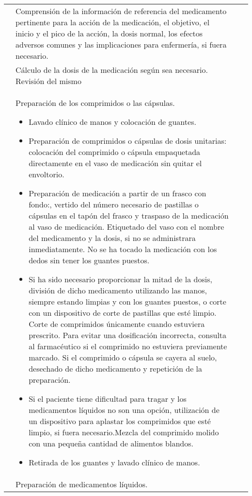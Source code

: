 \begin{landscape}
\begin{longtable}{N{0.15\textwidth}M{0.94\textwidth}|M{0.095\textwidth}M{0.22\textwidth}}
            & Comprensión de la información de referencia del medicamento pertinente para la acción de la medicación, el objetivo, el inicio y el pico de la acción, la dosis normal, los efectos adversos comunes y las implicaciones para enfermería, si fuera necesario.
            & & \\  
            & Cálculo de la dosis de la medicación según sea necesario. Revisión del mismo
            & & \\ 
            & Preparación de los comprimidos o las cápsulas.
            \begin{itemize}[topsep=0pt, partopsep=0pt,itemsep=0pt,parsep=0pt]
                \item Lavado clínico de manos y colocación de guantes.
                \item Preparación de comprimidos o cápsulas de dosis unitarias: colocación del comprimido o cápsula empaquetada directamente en el vaso de medicación sin quitar el envoltorio.
                \item Preparación de medicación a partir de un frasco con fondo:, vertido del número necesario de pastillas o cápsulas en el tapón del frasco y traspaso de la medicación al vaso de medicación. Etiquetado del vaso con el nombre del medicamento y la dosis, si no se administrara inmediatamente. No se ha tocado la medicación con los dedos sin tener los guantes puestos.
                \item Si ha sido necesario proporcionar la mitad de la dosis, división de dicho medicamento utilizando las manos, siempre estando limpias y con los guantes puestos, o corte con un dispositivo de corte de pastillas que esté limpio. Corte de comprimidos únicamente cuando estuviera prescrito. Para evitar una dosificación incorrecta, consulta al farmacéutico si el comprimido no estuviera previamente marcado. Si el comprimido o cápsula se cayera al suelo, desechado de dicho medicamento y repetición de la preparación.
                \item Si el paciente tiene dificultad para tragar y los medicamentos líquidos no son una opción, utilización de un dispositivo para aplastar los comprimidos que esté limpio, si fuera necesario.Mezcla del comprimido molido con una pequeña cantidad de alimentos blandos.
                \item Retirada de los guantes y lavado clínico de manos.
            \end{itemize}
            & & \\  
            & Preparación de medicamentos líquidos.

\end{longtable}
\end{landscape}
